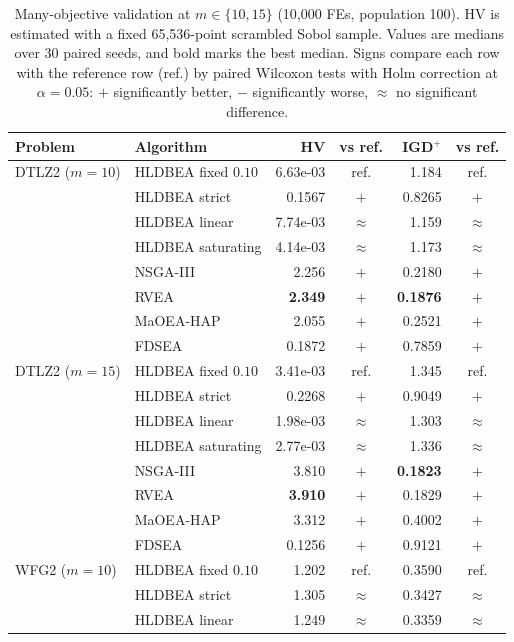 \begin{table}[!htbp]
\centering
\caption{Many-objective validation at $m\in\{10,15\}$ (10{,}000 FEs, population 100). HV is estimated with a fixed 65{,}536-point scrambled Sobol sample. Values are medians over 30 paired seeds, and bold marks the best median. Signs compare each row with the reference row (ref.) by paired Wilcoxon tests with Holm correction at $\alpha=0.05$: $+$ significantly better, $-$ significantly worse, $\approx$ no significant difference.}
\label{tab:manyobjective}
\small
\setlength{\tabcolsep}{3pt}
\begin{tabular}{|l|l|r|c|r|c|}
\hline
\textbf{Problem} & \textbf{Algorithm} & \textbf{HV} & \textbf{vs ref.} & \textbf{IGD$^+$} & \textbf{vs ref.} \\ \hline
DTLZ2 ($m=10$) & HLDBEA fixed $0.10$ & 6.63e-03 & ref. & 1.184 & ref. \\
 & HLDBEA strict & 0.1567 & $+$ & 0.8265 & $+$ \\
 & HLDBEA linear & 7.74e-03 & $\approx$ & 1.159 & $\approx$ \\
 & HLDBEA saturating & 4.14e-03 & $\approx$ & 1.173 & $\approx$ \\
 & NSGA-III & 2.256 & $+$ & 0.2180 & $+$ \\
 & RVEA & \textbf{2.349} & $+$ & \textbf{0.1876} & $+$ \\
 & MaOEA-HAP & 2.055 & $+$ & 0.2521 & $+$ \\
 & FDSEA & 0.1872 & $+$ & 0.7859 & $+$ \\
\hline
DTLZ2 ($m=15$) & HLDBEA fixed $0.10$ & 3.41e-03 & ref. & 1.345 & ref. \\
 & HLDBEA strict & 0.2268 & $+$ & 0.9049 & $+$ \\
 & HLDBEA linear & 1.98e-03 & $\approx$ & 1.303 & $\approx$ \\
 & HLDBEA saturating & 2.77e-03 & $\approx$ & 1.336 & $\approx$ \\
 & NSGA-III & 3.810 & $+$ & \textbf{0.1823} & $+$ \\
 & RVEA & \textbf{3.910} & $+$ & 0.1829 & $+$ \\
 & MaOEA-HAP & 3.312 & $+$ & 0.4002 & $+$ \\
 & FDSEA & 0.1256 & $+$ & 0.9121 & $+$ \\
\hline
WFG2 ($m=10$) & HLDBEA fixed $0.10$ & 1.202 & ref. & 0.3590 & ref. \\
 & HLDBEA strict & 1.305 & $\approx$ & 0.3427 & $\approx$ \\
 & HLDBEA linear & 1.249 & $\approx$ & 0.3359 & $\approx$ \\

\end{tabular}
\end{table}
